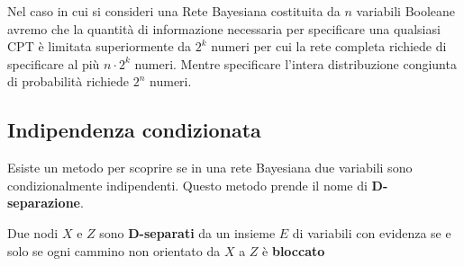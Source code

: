 Nel caso in cui si consideri una Rete Bayesiana costituita da $n$ variabili
Booleane avremo che la quantità di informazione necessaria per specificare una
qualsiasi CPT è limitata superiormente da $2^k$ numeri per cui la rete completa
richiede di specificare al più $n \cdot 2^k$ numeri. Mentre specificare l'intera
distribuzione congiunta di probabilità richiede $2^n$ numeri.
\subsection{Indipendenza condizionata}
Esiste un metodo per scoprire se in una rete Bayesiana due variabili sono
condizionalmente indipendenti. Questo metodo prende il nome di \textbf{D-separazione}.
\begin{definizione}
    Due nodi $X$ e $Z$ sono \textbf{D-separati} da un insieme $E$ di variabili con
    evidenza se e solo se ogni cammino non orientato da $X$ a $Z$ è \textbf{bloccato}
\end{definizione}

